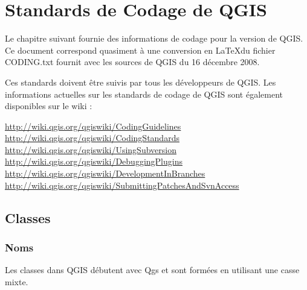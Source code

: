 
\section{Standards de Codage de QGIS}


Le chapitre suivant fournie des informations de codage pour la version \CURRENT de QGIS.
Ce document correspond quasiment \`a une conversion en \LaTeX du fichier CODING.txt fournit 
avec les sources de QGIS du 16 d\'ecembre 2008.

Ces standards doivent \^etre suivis par tous les d\'eveloppeurs de QGIS. Les informations actuelles
sur les standards de codage de QGIS sont \'egalement disponibles sur le wiki :

\url{http://wiki.qgis.org/qgiswiki/CodingGuidelines} \\
\url{http://wiki.qgis.org/qgiswiki/CodingStandards} \\
\url{http://wiki.qgis.org/qgiswiki/UsingSubversion} \\
\url{http://wiki.qgis.org/qgiswiki/DebuggingPlugins} \\
\url{http://wiki.qgis.org/qgiswiki/DevelopmentInBranches} \\
\url{http://wiki.qgis.org/qgiswiki/SubmittingPatchesAndSvnAccess} \\

\subsection{Classes}
\subsubsection{Noms}
Les classes dans QGIS d\'ebutent avec Qgs et sont form\'ees en utilisant une casse mixte.

